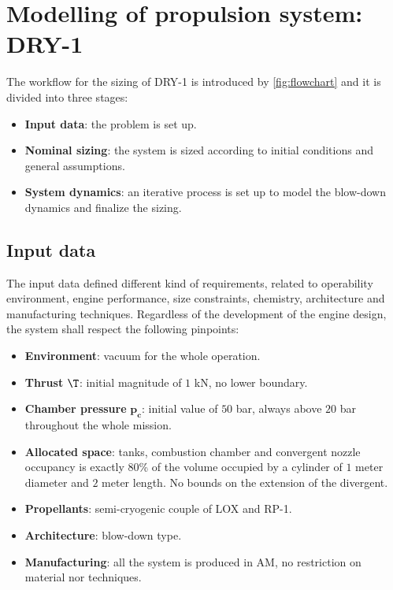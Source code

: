 \pagebreak
\section{Modelling of propulsion system: DRY-1}
\label{sec:modelling}

The workflow for the sizing of DRY-1 is introduced by \autoref{fig:flowchart} and it is divided into three stages:
\begin{itemize}
    \item \textbf{Input data}:  the problem is set up. 
    \item \textbf{Nominal sizing}: the system is sized according to initial conditions and general assumptions.
    \item \textbf{System dynamics}: an iterative process is set up to model the blow-down dynamics and finalize the sizing.
\end{itemize}


\subsection{Input data}
\label{subsec:input_data}

The input data defined different kind of requirements, related to operability environment, engine performance, size constraints, chemistry, architecture and manufacturing techniques. Regardless of the development of the engine design, the system shall respect the following pinpoints:
\begin{itemize}
    \item \textbf{Environment}: vacuum for the whole operation.
    \item \textbf{Thrust} $\boldsymbol{\T}$: initial magnitude of $1$ kN, no lower boundary.
    \item \textbf{Chamber pressure} $\boldsymbol{p_c}$: initial value of $50$ bar, always above $20$ bar throughout the whole mission.
    \item \textbf{Allocated space}: tanks, combustion chamber and convergent nozzle occupancy is exactly $80$\% of the volume occupied by a cylinder of $1$ meter diameter and $2$ meter length. No bounds on the extension of the divergent.
    \item \textbf{Propellants}: semi-cryogenic couple of LOX and RP-1.
    \item \textbf{Architecture}: blow-down type.
    \item \textbf{Manufacturing}: all the system is produced in AM, no restriction on material nor techniques. 
\end{itemize} 

